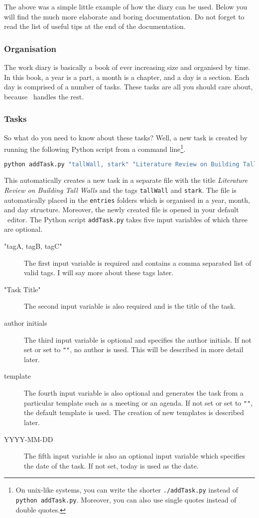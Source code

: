 The above was a simple little example of how the diary can be used. Below you will find the much more elaborate and boring documentation. Do not forget to read the list of useful tips at the end of the documentation.

\subsubsection*{Organisation}
The work diary is basically a book of ever increasing size and organised by time. In this book, a year is a part, a month is a chapter, and a day is a section. Each day is comprised of a number of tasks. These tasks are all you should care about, because \LaTeXe\ handles the rest.

\subsubsection*{Tasks}
So what do you need to know about these tasks? Well, a new task is created by running the following Python script from a command line\footnote{On unix-like systems, you can write the shorter {\tt ./addTask.py} instead of {\tt python addTask.py}. Moreover, you can also use single quotes instead of double quotes.}.
\begin{lstlisting}[language=bash]
python addTask.py "tallWall, stark" "Literature Review on Building Tall Walls"
\end{lstlisting}
This automatically creates a new task in a separate file with the title \textit{Literature Review on Building Tall Walls} and the tags {\tt tallWall} and {\tt stark}. The file is automatically placed in the {\tt entries} folders which is organised in a year, month, and day structure. Moreover, the newly created file is opened in your default \LaTeXe\ editor. The Python script {\tt addTask.py} takes five input variables of which three are optional.
\begin{description}
  \item["tagA, tagB, tagC"] The first input variable is required and contains a comma separated list of valid tags. I will say more about these tags later.
  \item["Task Title"] The second input variable is also required and is the title of the task.
  \item[author initials] The third input variable is optional and specifies the author initials. If not set or set to {\tt ""}, no author is used. This will be described in more detail later.
  \item[template] The fourth input variable is also optional and generates the task from a particular template such as a meeting or an agenda. If not set or set to {\tt ""}, the default template is used. The creation of new templates is described later.
  \item[YYYY-MM-DD] The fifth input variable is also an optional input variable which specifies the date of the task. If not set, today is used as the date.
\end{description}

